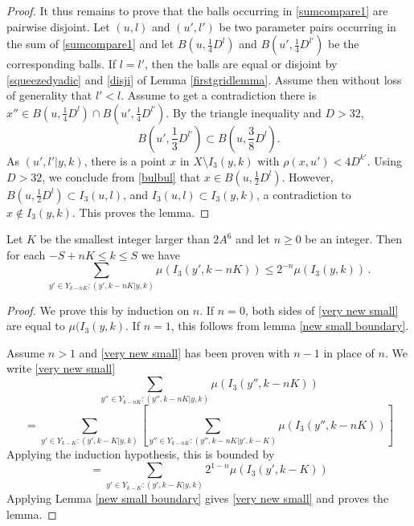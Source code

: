 \begin{proof}
It thus remains to prove that the balls
occurring in
\eqref{sumcompare1} are pairwise disjoint.
Let $(u,l)$ and $(u',l')$ be two parameter pairs occurring
in the sum of \eqref{sumcompare1} and let
$ B(u, \frac 14 D^l)$ and $B({u'}, \frac 14 D^{l'})$
be the corresponding balls. If
$l=l'$, then the balls are equal or disjoint by
\eqref{squeezedyadic} and \eqref{disji} of Lemma \ref{firstgridlemma}. Assume then without loss of generality that $l'<l$. Assume to get a contradiction there is $x''\in  B(u, \frac 14 D^l)\cap B({u'}, \frac 14 D^{l'})$.
By the triangle inequality and $D>32$,
\begin{equation}\label{bulbul}
    B(u', \frac 13 D^{l'})\subset B(u, \frac 38 D^l).
\end{equation}
As $(u',l'|y,k)$, there is a point  $x$ in
$X\setminus I_3(y,k)$ with $\rho(x,u')<4D^{k'}$.
Using $D>32$, we conclude from \eqref{bulbul} that
$x\in B(u,\frac 12D^l)$. However, $B(u,\frac 12 D^l)\subset I_3(u,l)$,
and $I_3(u,l)\subset I_3(y,k)$, a contradiction to
$x\not\in I_3(y,k)$.
This proves the lemma.
\end{proof}


\begin{lemma}
Let $K$ be the smallest integer larger than $2A^6$
and let $n\ge 0$ be an integer. Then
for each $-S+nK\le k\le S$ we have
    \begin{equation}
        \label{very new small}
        \sum_{y'\in Y_{k-nK}: (y',k-nK|y,k)}\mu(I_3(y',k-nK)) \le 2^{-n} \mu(I_3(y,k))\,.
    \end{equation}
\end{lemma}
\begin{proof}
    We prove this by induction on $n$. If $n=0$,
    both sides of \eqref{very new small} are equal to
    $\mu(I_3(y,k)$. If $n=1$, this follows from lemma \ref{new small boundary}.

    Assume $n>1$ and \eqref{very new small} has been proven with  $n-1$ in place of $n$.
We write  \eqref{very new small}
        \begin{equation}
                \sum_{y''\in Y_{k-nK}: (y'',k-nK|y,k)}\mu(I_3(y'',k-nK))
    \end{equation}
        \begin{equation}
=  \sum_{y'\in Y_{k-K}:(y',k-K|y,k)}   \left[   \sum_{y''\in Y_{k-nK}: (y'',k-nK|y',k-K)}\mu(I_3(y'',k-nK)) \right]
    \end{equation}
Applying the induction hypothesis, this is bounded by
            \begin{equation}
=  \sum_{y'\in Y_{k-K}:(y',k-K|y,k)}   2^{1-n}\mu(I_3(y',k-K))
    \end{equation}
Applying Lemma \ref{new small boundary} gives
\eqref{very new small} and proves the lemma.
\end{proof}

